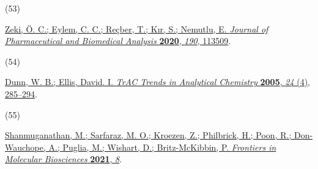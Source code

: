 \documentclass[journal=jacsat,manuscript=article]{achemso}
\newlength{\cslhangindent}
\newlength{\csllabelwidth}
\newenvironment{CSLReferences}[2] %
 {\begin{list}{}{%
  \setlength{\itemindent}{0pt}
  \setlength{\leftmargin}{0pt}
  \setlength{\parsep}{0pt}
  \ifodd #1
   \setlength{\leftmargin}{\cslhangindent}
   \setlength{\itemindent}{-1\cslhangindent}
  \fi
  \setlength{\itemsep}{#2\baselineskip}}}
 {\end{list}}
\newcommand{\CSLLeftMargin}[1]{\parbox[t]{\csllabelwidth}{#1}}
\newcommand{\CSLRightInline}[1]{\parbox[t]{\linewidth - \csllabelwidth}{#1}\break}
\begin{document}
\begin{CSLReferences}{0}{0}
\CSLLeftMargin{(53) }%
\CSLRightInline{\href{https://doi.org/10.1016/j.jpba.2020.113509}{Zeki,
Ö. C.; Eylem, C. C.; Reçber, T.; Kır, S.; Nemutlu, E. \emph{Journal of
Pharmaceutical and Biomedical Analysis} \textbf{2020}, \emph{190},
113509}.}

\CSLLeftMargin{(54) }%
\CSLRightInline{\href{https://doi.org/10.1016/j.trac.2004.11.021}{Dunn,
W. B.; Ellis, David. I. \emph{TrAC Trends in Analytical Chemistry}
\textbf{2005}, \emph{24} (4), 285--294}.}

\CSLLeftMargin{(55) }%
\CSLRightInline{\href{https://doi.org/10.3389/fmolb.2021.676349}{Shanmuganathan,
M.; Sarfaraz, M. O.; Kroezen, Z.; Philbrick, H.; Poon, R.; Don-Wauchope,
A.; Puglia, M.; Wishart, D.; Britz-McKibbin, P. \emph{Frontiers in
Molecular Biosciences} \textbf{2021}, \emph{8}}.}

\end{CSLReferences}
\end{document}
